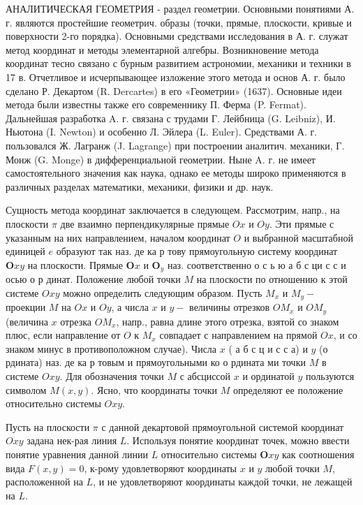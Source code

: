 \documentclass[10pt]{article}
\begin{document}
АНАЛИТИЧЕСКАЯ ГЕОМЕТРИЯ - раздел геометрии. Основными понятиями А. г. являются простейшие геометрич. образы (точки, прямые, плоскости, кривые и поверхности 2-го порядка). Основными средствами исследования в А. г. служат метод координат и методы элементарной алгебры. Возникновение метода координат тесно связано с бурным развитием астрономии, механики и техники в 17 в. Отчетливое и исчерпывающее изложение этого метода и основ А. г. было сделано Р. Декартом (R. Dercartes) в его «Геометрии» (1637). Основные идеи метода были известны также его современнику П. Ферма (P. Fermat). Дальнейшая разработка A. г. связана с трудами Г. Лейбница (G. Leibniz), И. Ньютона (I. Newton) и особенно Л. Эйлера (L. Euler). Средствами А. г. пользовался Ж. Лагранж (J. Lagrange) при построении аналитич. механики, Г. Монж (G. Monge) в дифференциальной геометрии. Ныне A. г. не имеет самостоятельного значения как наука, однако ее методы широко применяются в различных разделах математики, механики, физики и др. наук.



Сущность метода координат заключается в следующем. Рассмотрим, напр., на плоскости $\pi$ две взаимно перпендикулярные прямые $O x$ и $O y$. Эти прямые с указанным на них направлением, началом координат $O$ и выбранной масштабной единицей $e$ образуют так наз. де ка р тову прямоугольную систему координат $\boldsymbol{O} x y$ на плоскости. Прямые $\boldsymbol{O} x$ и $\boldsymbol{O}_{y}$ наз. соответственно о с ь ю а б с ци с с и осью о р динат. Положение любой точки $M$ на плоскости по отношению к этой системе $O x y$ можно определить следующим образом. Пусть $M_{x}$ и $M_{y}-$ проекции $M$ на $O x$ и $O y$, а числа $x$ и $y-$ величины отрезков $O M_{x}$ и $O M_{y}$ (величина $x$ отрезка $O M_{x}$, напр., равна длине этого отрезка, взятой со знаком плюс, если направление от $O$ к $M_{x}$ совпадает с направлением на прямой $O x$, и со знаком минус в противоположном случае). Числа $x$ ( а б с ц и с с а) и $y$ (о рдината) наз. де ка р товым и прямоугольными ко о рдината ми точки $M$ в системе $O x y$. Для обозначения точки $M$ с абсциссой $x$ и ординатой $y$ пользуются символом $M(x, y)$. Ясно, что координаты точки $M$ определяют ее положение относительно системы $O x y$.



Пусть на плоскости $\pi$ с данной декартовой прямоугольной системой координат $O x y$ задана нек-рая линия $L$. Используя понятие координат точек, можно ввести понятие уравнения данной линии $L$ относительно системы $\boldsymbol{O} x y$ как соотношения вида $F(x, y)=0$, к-рому удовлетворяют координаты $x$ и $y$ любой точки $M$, расположенной на $L$, и не удовлетворяют координаты каждой точки, не лежащей на $L$.
\end{document}
